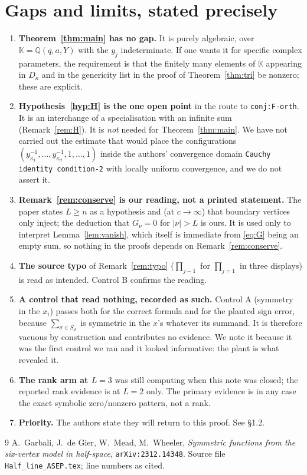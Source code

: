 \documentclass[11pt]{article}
\theoremstyle{definition}
\theoremstyle{remark}
\newcommand{\QQ}{\mathbb{Q}}
\newcommand{\KK}{\mathbb{K}}
\begin{document}
\section{Gaps and limits, stated precisely}\label{sec:gaps}

\begin{enumerate}
\item \textbf{Theorem~\ref{thm:main} has no gap.} It is purely algebraic, over
  $\KK=\QQ(q,a,Y)$ with the $y_j$ indeterminate. If one wants it for specific complex
  parameters, the requirement is that the finitely many elements of $\KK$ appearing in
  $D_\kappa$ and in the genericity list in the proof of Theorem~\ref{thm:tri} be nonzero; these
  are explicit.
\item \textbf{Hypothesis~\ref{hyp:H} is the one open point} in the route to
  \texttt{conj:F-orth}. It is an interchange of a specialisation with an infinite sum
  (Remark~\ref{rem:H}). It is \emph{not} needed for Theorem~\ref{thm:main}. We have not carried
  out the estimate that would place the configurations
  $(y_{\kappa_1}^{-1},\dots,y_{\kappa_d}^{-1},1,\dots,1)$ inside the authors' convergence
  domain \texttt{Cauchy identity condition-2} with locally uniform convergence, and we do not
  assert it.
\item \textbf{Remark~\ref{rem:conserve} is our reading, not a printed statement.} The paper
  states $L\ge n$ as a hypothesis and (at $c\to\infty$) that boundary vertices only inject; the
  deduction that $G_\nu=0$ for $|\nu|>L$ is ours. It is used only to interpret
  Lemma~\ref{lem:vanish}, which itself is immediate from \eqref{eq:G} being an empty sum, so
  nothing in the proofs depends on Remark~\ref{rem:conserve}.
\item \textbf{The source typo} of Remark~\ref{rem:typo} ($\prod_{j-1}$ for $\prod_{j=1}$ in
  three displays) is read as intended. Control B confirms the reading.
\item \textbf{A control that read nothing, recorded as such.} Control A (symmetry in the
  $x_i$) passes both for the correct formula and for the planted sign error, because
  $\sum_{\sigma\in S_d}$ is symmetric in the $x$'s whatever its summand. It is therefore
  vacuous by construction and contributes no evidence. We note it because it was the first
  control we ran and it looked informative: the plant is what revealed it.
\item \textbf{The rank arm at $L=3$} was still computing when this note was closed; the
  reported rank evidence is at $L=2$ only. The primary evidence is in any case the exact
  symbolic zero/nonzero pattern, not a rank.
\item \textbf{Priority.} The authors state they will return to this proof. See \S1.2.
\end{enumerate}

\begin{thebibliography}{9}
 A.~Garbali, J.~de Gier, W.~Mead, M.~Wheeler,
  \emph{Symmetric functions from the six-vertex model in half-space},
  \texttt{arXiv:2312.14348}. Source file \texttt{Half\_line\_ASEP.tex}; line numbers as cited.
\end{thebibliography}
\end{document}
